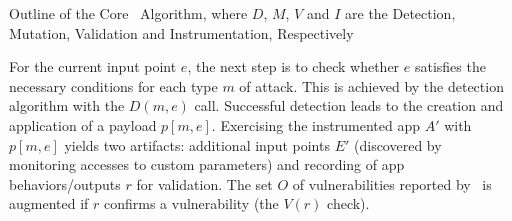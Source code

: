 \begin{algorithm}[t]
\DontPrintSemicolon
{}
\;
\;
\;
\caption{\label{Al:maalg}Outline of the Core \Tool\ Algorithm, where $D$, $M$, $V$ and $I$ are the Detection, Mutation, Validation and Instrumentation, Respectively}
\end{algorithm}


For the current input point $e$, the next step is to check whether $e$ satisfies the necessary conditions for each type $m$ of attack. This is achieved by the detection algorithm with the $D(m,e)$ call. Successful detection leads to the creation and application of a payload $p[m,e]$. Exercising the instrumented app $A'$ with $p[m,e]$ yields two artifacts: additional input points $E'$ (discovered by monitoring accesses to custom parameters) and recording of app behaviors/outputs $r$ for validation. The set $O$ of vulnerabilities reported by \Tool\ is augmented if $r$ confirms a vulnerability (the $V(r)$ check).

